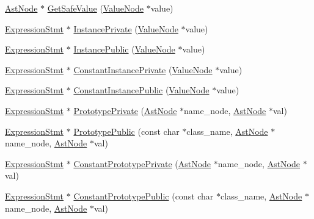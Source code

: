 \begin{DoxyCompactItemize}
\item 
\hyperlink{classmocha_1_1_ast_node}{AstNode} $\ast$ \hyperlink{classmocha_1_1_class_processor_utils_a4745971a910122bc31e366c0fa49f114}{GetSafeValue} (\hyperlink{classmocha_1_1_value_node}{ValueNode} $\ast$value)
\item 
\hyperlink{classmocha_1_1_expression_stmt}{ExpressionStmt} $\ast$ \hyperlink{classmocha_1_1_class_processor_utils_a2ff3e378a45327df8060e236970407b8}{InstancePrivate} (\hyperlink{classmocha_1_1_value_node}{ValueNode} $\ast$value)
\item 
\hyperlink{classmocha_1_1_expression_stmt}{ExpressionStmt} $\ast$ \hyperlink{classmocha_1_1_class_processor_utils_a425461673b00f5f837a893277b4d14cf}{InstancePublic} (\hyperlink{classmocha_1_1_value_node}{ValueNode} $\ast$value)
\item 
\hyperlink{classmocha_1_1_expression_stmt}{ExpressionStmt} $\ast$ \hyperlink{classmocha_1_1_class_processor_utils_abe05538ee0cc20be8f3740d05db761ae}{ConstantInstancePrivate} (\hyperlink{classmocha_1_1_value_node}{ValueNode} $\ast$value)
\item 
\hyperlink{classmocha_1_1_expression_stmt}{ExpressionStmt} $\ast$ \hyperlink{classmocha_1_1_class_processor_utils_ad239680f421167da1c307681f6b81197}{ConstantInstancePublic} (\hyperlink{classmocha_1_1_value_node}{ValueNode} $\ast$value)
\item 
\hyperlink{classmocha_1_1_expression_stmt}{ExpressionStmt} $\ast$ \hyperlink{classmocha_1_1_class_processor_utils_a4b47f30d7968755e17db302f8fe7bf9c}{PrototypePrivate} (\hyperlink{classmocha_1_1_ast_node}{AstNode} $\ast$name\_\-node, \hyperlink{classmocha_1_1_ast_node}{AstNode} $\ast$val)
\item 
\hyperlink{classmocha_1_1_expression_stmt}{ExpressionStmt} $\ast$ \hyperlink{classmocha_1_1_class_processor_utils_ac931857f4f62031b1ba249cf233da5c1}{PrototypePublic} (const char $\ast$class\_\-name, \hyperlink{classmocha_1_1_ast_node}{AstNode} $\ast$name\_\-node, \hyperlink{classmocha_1_1_ast_node}{AstNode} $\ast$val)
\item 
\hyperlink{classmocha_1_1_expression_stmt}{ExpressionStmt} $\ast$ \hyperlink{classmocha_1_1_class_processor_utils_af5b9c37de2825626bf80a70c43d41c00}{ConstantPrototypePrivate} (\hyperlink{classmocha_1_1_ast_node}{AstNode} $\ast$name\_\-node, \hyperlink{classmocha_1_1_ast_node}{AstNode} $\ast$val)
\item 
\hyperlink{classmocha_1_1_expression_stmt}{ExpressionStmt} $\ast$ \hyperlink{classmocha_1_1_class_processor_utils_a50068b6d373030e45c8c57a0eee045c4}{ConstantPrototypePublic} (const char $\ast$class\_\-name, \hyperlink{classmocha_1_1_ast_node}{AstNode} $\ast$name\_\-node, \hyperlink{classmocha_1_1_ast_node}{AstNode} $\ast$val)

\end{DoxyCompactItemize}
